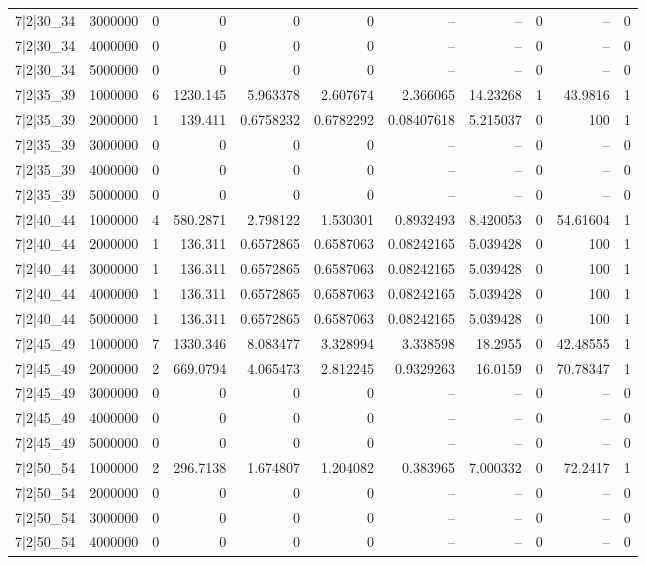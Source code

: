 \begin{tabular}{lrrrrrrrrrr}
7|2|30\_34 & 3000000 & 0 & 0 & 0 & 0 & -- & -- & 0 & -- & 0 \\
7|2|30\_34 & 4000000 & 0 & 0 & 0 & 0 & -- & -- & 0 & -- & 0 \\
7|2|30\_34 & 5000000 & 0 & 0 & 0 & 0 & -- & -- & 0 & -- & 0 \\
7|2|35\_39 & 1000000 & 6 & 1230.145 & 5.963378 & 2.607674 & 2.366065 & 14.23268 & 1 & 43.9816 & 1 \\
7|2|35\_39 & 2000000 & 1 & 139.411 & 0.6758232 & 0.6782292 & 0.08407618 & 5.215037 & 0 & 100 & 1 \\
7|2|35\_39 & 3000000 & 0 & 0 & 0 & 0 & -- & -- & 0 & -- & 0 \\
7|2|35\_39 & 4000000 & 0 & 0 & 0 & 0 & -- & -- & 0 & -- & 0 \\
7|2|35\_39 & 5000000 & 0 & 0 & 0 & 0 & -- & -- & 0 & -- & 0 \\
7|2|40\_44 & 1000000 & 4 & 580.2871 & 2.798122 & 1.530301 & 0.8932493 & 8.420053 & 0 & 54.61604 & 1 \\
7|2|40\_44 & 2000000 & 1 & 136.311 & 0.6572865 & 0.6587063 & 0.08242165 & 5.039428 & 0 & 100 & 1 \\
7|2|40\_44 & 3000000 & 1 & 136.311 & 0.6572865 & 0.6587063 & 0.08242165 & 5.039428 & 0 & 100 & 1 \\
7|2|40\_44 & 4000000 & 1 & 136.311 & 0.6572865 & 0.6587063 & 0.08242165 & 5.039428 & 0 & 100 & 1 \\
7|2|40\_44 & 5000000 & 1 & 136.311 & 0.6572865 & 0.6587063 & 0.08242165 & 5.039428 & 0 & 100 & 1 \\
7|2|45\_49 & 1000000 & 7 & 1330.346 & 8.083477 & 3.328994 & 3.338598 & 18.2955 & 0 & 42.48555 & 1 \\
7|2|45\_49 & 2000000 & 2 & 669.0794 & 4.065473 & 2.812245 & 0.9329263 & 16.0159 & 0 & 70.78347 & 1 \\
7|2|45\_49 & 3000000 & 0 & 0 & 0 & 0 & -- & -- & 0 & -- & 0 \\
7|2|45\_49 & 4000000 & 0 & 0 & 0 & 0 & -- & -- & 0 & -- & 0 \\
7|2|45\_49 & 5000000 & 0 & 0 & 0 & 0 & -- & -- & 0 & -- & 0 \\
7|2|50\_54 & 1000000 & 2 & 296.7138 & 1.674807 & 1.204082 & 0.383965 & 7.000332 & 0 & 72.2417 & 1 \\
7|2|50\_54 & 2000000 & 0 & 0 & 0 & 0 & -- & -- & 0 & -- & 0 \\
7|2|50\_54 & 3000000 & 0 & 0 & 0 & 0 & -- & -- & 0 & -- & 0 \\
7|2|50\_54 & 4000000 & 0 & 0 & 0 & 0 & -- & -- & 0 & -- & 0 \\

\end{tabular}
